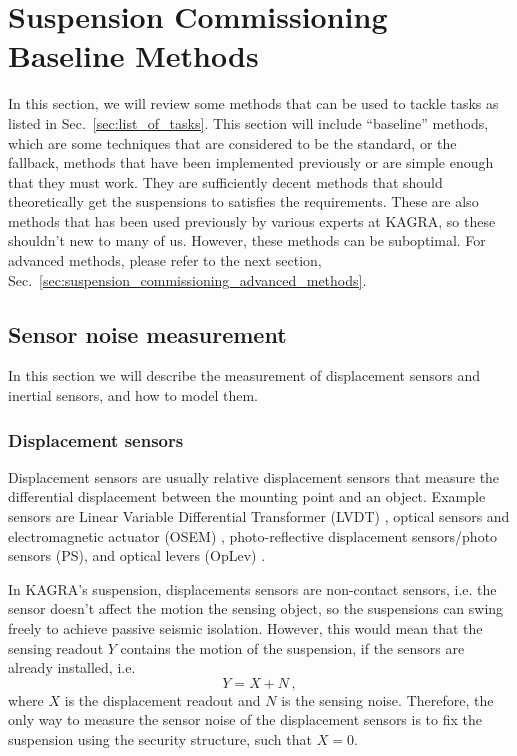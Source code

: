\section{Suspension Commissioning Baseline Methods \label{sec:suspension_commissioning_baseline_methods}}
In this section, we will review some methods that can be used to tackle tasks as listed in Sec.~\ref{sec:list_of_tasks}.
This section will include ``baseline'' methods, which are some techniques that are considered to be the standard, or the fallback, methods that have been implemented previously or are simple enough that they must work.
They are sufficiently decent methods that should theoretically get the suspensions to satisfies the requirements.
These are also methods that has been used previously by various experts at KAGRA, so these shouldn't new to many of us.
However, these methods can be suboptimal.
For advanced methods, please refer to the next section, Sec.~\ref{sec:suspension_commissioning_advanced_methods}.

\subsection{Sensor noise measurement}
In this section we will describe the measurement of displacement sensors and inertial sensors, and how to model them.

\subsubsection{Displacement sensors \label{displacement_sensors_baseline}}
Displacement sensors are usually relative displacement sensors that measure the differential displacement between the mounting point and an object.
Example sensors are Linear Variable Differential Transformer (LVDT) \cite{Akutsu:2021auw}, optical sensors and electromagnetic actuator (OSEM) \cite{Akutsu:2020efg, use_of_osems}, photo-reflective displacement sensors/photo sensors (PS), and optical levers (OpLev) \cite{sensing_matrices_oplev, length_sensing_oplev, optical_lever_for_kagra}.

In KAGRA's suspension, displacements sensors are non-contact sensors, i.e. the sensor doesn't affect the motion the sensing object, so the suspensions can swing freely to achieve passive seismic isolation.
However, this would mean that the sensing readout $Y$ contains the motion of the suspension, if the sensors are already installed, i.e.
\begin{equation}
	Y=X+N\,,
	\label{eqn:displacementsensing_readout}
\end{equation}
where $X$ is the displacement readout and $N$ is the sensing noise.
Therefore, the only way to measure the sensor noise of the displacement sensors is to fix the suspension using the security structure, such that $X=0$.

